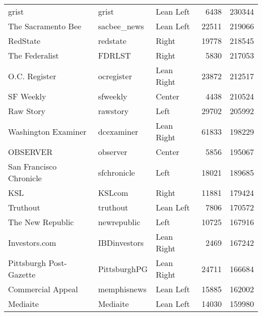 \begin{tabular}{lllrr}
                                    grist &            grist &     Lean Left &              6438 &     230344 \\
                       The Sacramento Bee &      sacbee\_news &     Lean Left &             22511 &     219066 \\
                                 RedState &         redstate &         Right &             19778 &     218545 \\
                           The Federalist &           FDRLST &         Right &              5830 &     217053 \\
                            O.C. Register &       ocregister &    Lean Right &             23872 &     212517 \\
                                SF Weekly &         sfweekly &        Center &              4438 &     210524 \\
                                Raw Story &         rawstory &          Left &             29702 &     205992 \\
                      Washington Examiner &       dcexaminer &    Lean Right &             61833 &     198229 \\
                                 OBSERVER &         observer &        Center &              5856 &     195067 \\
                  San Francisco Chronicle &      sfchronicle &          Left &             18021 &     189685 \\
                                      KSL &           KSLcom &         Right &             11881 &     179424 \\
                                 Truthout &         truthout &     Lean Left &              7806 &     170572 \\
                         The New Republic &      newrepublic &          Left &             10725 &     167916 \\
                            Investors.com &     IBDinvestors &    Lean Right &              2469 &     167242 \\
                  Pittsburgh Post-Gazette &     PittsburghPG &    Lean Right &             24711 &     166684 \\
                        Commercial Appeal &      memphisnews &     Lean Left &             15885 &     162002 \\
                                 Mediaite &         Mediaite &     Lean Left &             14030 &     159980 \\

\end{tabular}
